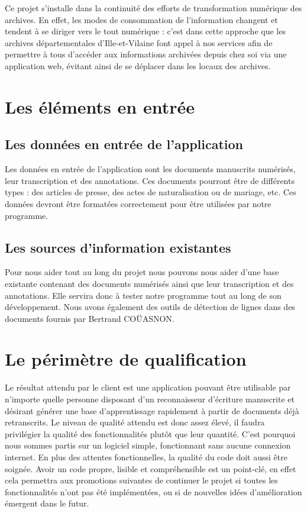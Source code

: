 Ce projet s’installe dans la continuité des efforts de transformation numérique des archives. En effet, les modes de consommation de l’information changent et tendent à se diriger vers le tout numérique : c’est dans cette approche que les archives départementales d’Ille-et-Vilaine font appel à nos services afin de permettre à tous d’accéder aux informations archivées depuis chez soi via une application web, évitant ainsi de se déplacer dans les locaux des archives.

\section{Les éléments en entrée}

\subsection{Les données en entrée de l'application}

Les données en entrée de l’application sont les documents manuscrits numérisés, leur transcription et des annotations. Ces documents pourront être de différents types : des articles de presse, des actes de naturalisation ou de mariage, etc. Ces données devront être formatées correctement pour être utilisées par notre programme.

\newpage

\subsection{Les sources d'information existantes}

Pour nous aider tout au long du projet nous pouvons nous aider d’une base existante contenant des documents numérisés ainsi que leur transcription et des annotations. Elle servira donc à tester notre programme tout au long de son développement. Nous avons également des outils de détection de lignes dans des documents fournis par Bertrand COÜASNON.

\section{Le périmètre de qualification}

Le résultat attendu par le client est une application pouvant être utilisable par n’importe quelle personne disposant d’un reconnaisseur d’écriture manuscrite et désirant générer une base d’apprentissage rapidement à partir de documents déjà retranscrits. Le niveau de qualité attendu est donc assez élevé, il faudra privilégier la qualité des fonctionnalités plutôt que leur quantité. C’est pourquoi nous sommes partis sur un logiciel simple, fonctionnant sans aucune connexion internet. En plus des attentes fonctionnelles, la qualité du code doit aussi être soignée. Avoir un code propre, lisible et compréhensible est un point-clé, en effet cela permettra aux promotions suivantes de continuer le projet si toutes les fonctionnalités n’ont pas été implémentées, ou si de nouvelles idées d’amélioration émergent dans le futur.

